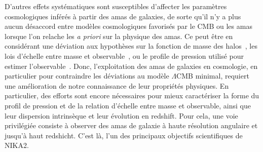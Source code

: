 D'autres effets systématiques sont susceptibles d'affecter les
paramètres cosmologiques inférés à partir des amas de galaxies, de
sorte qu'il n'y a plus aucun désaccord entre modèles cosmologiques
favorisés par le CMB ou les amas lorsque l'on relache les \emph{a
priori} sur la physique des amas. Ce peut être en considérant une
déviation aux hypothèses sur la fonction de masse des
halos~\citep{Bocquet2016}, les lois d'échelle entre masse et
observable~\citep{Planck_2016_SZ_cosmo}, ou le profile de pression
utilisé pour estimer l'observable~\citep{Ruppin2019b}. Donc,
l'exploitation des amas de galaxies en cosmologie, en particulier pour
contraindre les déviations au modèle $\Lambda$CMB minimal, requiert
une amélioration de notre connaissance de leur propriétés
physiques. En particulier, des efforts sont encore nécessaires pour
mieux caractériser la forme du profil de pression et de la relation
d'échelle entre masse et observable, ainsi que leur dispersion
intrinsèque et leur évolution en redshift.  
Pour cela, une voie privilégiée consiste à observer des amas de
galaxie à haute résolution angulaire et jusqu'à haut redshicht. C'est
là, l'un des principaux objectifs scientifiques de NIKA2. 



%
%
%
%

